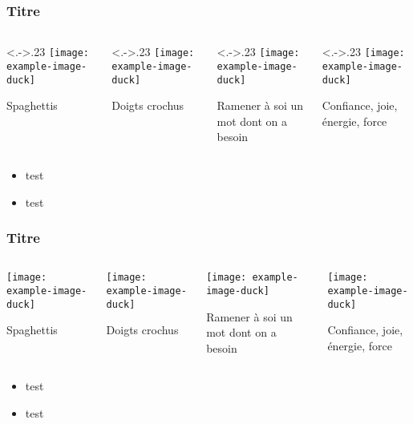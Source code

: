 \documentclass{beamer}
\begin{document}
\begin{frame}
  \frametitle{Titre}
  \begin{columns}[T,onlytextwidth]
    \begin{column}<.->{.23\textwidth}
      \centering
      \texttt{[image: example-image-duck]}

      Spaghettis
    \end{column}
    \begin{column}<.->{.23\textwidth}
      \centering
      \texttt{[image: example-image-duck]}

      Doigts crochus
    \end{column}
    \begin{column}<.->{.23\textwidth}
      \centering
      \texttt{[image: example-image-duck]}

      Ramener à soi un mot dont on a besoin
    \end{column}
    \begin{column}<.->{.23\textwidth}
      \centering
      \texttt{[image: example-image-duck]}

      Confiance, joie, énergie, force
    \end{column}
\end{columns}

\begin{itemize}
\item test
\item test
\end{itemize}
\end{frame}

\begin{frame}
  \frametitle{Titre}
  {
  \begin{columns}[T,onlytextwidth]
    \begin{column}{.23\textwidth}
      \centering
      \texttt{[image: example-image-duck]}

      Spaghettis
    \end{column}
    \begin{column}{.23\textwidth}
      \centering
      \texttt{[image: example-image-duck]}

      Doigts crochus
    \end{column}
    \begin{column}{.23\textwidth}
      \centering
      \texttt{[image: example-image-duck]}

      Ramener à soi un mot dont on a besoin
    \end{column}
    \begin{column}{.23\textwidth}
      \centering
      \texttt{[image: example-image-duck]}

      Confiance, joie, énergie, force
    \end{column}
\end{columns}
}

\begin{itemize}
\item test
\item test
\end{itemize}
\end{frame}
\end{document}
